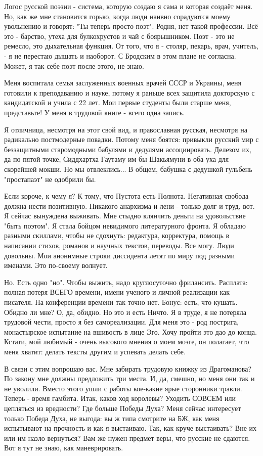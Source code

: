 Логос русской поэзии - система, которую создаю я сама и которая создаёт меня.
Но, как же мне становится горько, когда люди наивно сорадуются моему увольнению
и говорят: "Ты теперь просто поэт". Родня, нет такой профессии. Всё это -
барство, утеха для булкохрустов и чай с боярышником. Поэт - это не ремесло, это
дыхательная функция. От того, что я - столяр, пекарь, врач, учитель, - я не
перестаю дышать и наоборот. С Бродским в этом плане не согласна. Может, я так
себе поэт после этого, не знаю.

Меня воспитала семья заслуженных военных врачей СССР и Украины, меня готовили к
преподаванию и науке, потому я раньше всех защитила докторскую с кандидатской и
учила с 22 лет. Мои первые студенты были старше меня, представьте! У меня в
трудовой книге - всего одна запись. 

Я отличница, несмотря на этот свой вид, и православная русская, несмотря на
радикально постмодерные повадки. Потому меня боятся: привыкли русский мир с
беззащитными старомодными бабулями и дедулями ассоциировать. Делезом  их, да по
пятой точке, Сиддхартха Гаутаму им бы Шакьямуни в оба уха для скорейшей мокши.
Но мы отвлеклись... В общем, бабушка с дедушкой гульбень "простапаэт" не
одобрили бы.

Если короче, к чему я? К тому, что Пустота есть Полнота. Негативная свобода
должна нести позитивную. Никакого анархизма и лени - только долг и труд, вот. Я
сейчас вынуждена выживать. Мне стыдно клянчить деньги на удовольствие "быть
поэтом". Я стала бойцом невидимого литературного фронта. Я обладаю разными
скиллами, чтобы не сдохнуть: редактура, корректура, помощь в написании стихов,
романов и научных текстов, переводы. Все могу. Люди довольны. Мои анонимные
строки диссидента летят по миру под разными именами. Это по-своему волнует. 

Но. Есть одно "но". Чтобы выжить, надо круглосуточно фрилансить. Расплата:
полная потеря ВСЕГО времени, имени ученого и личной реализации как писателя. На
конференции времени так точно нет. Бонус: есть, что кушать. Обидно ли мне? О,
да, обидно. Но это и есть Ничто. Я в труде, я не потеряла трудовой чести,
просто я без самореализации. Для меня это - род пострига, монастырское
испытание на вшивость в лице Эго. Хочу пройти это дао до конца. Кстати, мой
любимый - очень высокого мнения о моем мозге, он полагает, что меня хватит:
делать тексты другим и успевать делать себе.

В связи с этим вопрошаю вас. Мне забирать трудовую книжку из Драгоманова? По
закону мне должны предложить три места. И, да, смешно, но меня они так и не
уволили. Вместо этого ушли с работы кое-какие ярые сторонники травли. Теперь -
время гамбита. Итак, каков ход королевы? Уходить СОВСЕМ или цепляться из
вредности? Где больше Победы Духа? Меня сейчас интересует только Победа Духа,
не выгода: вы ж типа смотрите на БЖ, как меня испытывают на прочность и как я
выстаиваю. Так, как круче выстаивать? Вне их или им назло вернуться? Вам же
нужен предмет веры, что русские не сдаются. Вот я тут не знаю, как
маневрировать. 


